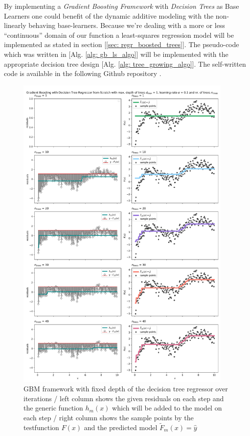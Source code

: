 \documentclass[12pt, a4paper]{article}
\begin{document}
By implementing a \textit{Gradient Boosting Framework} with \textit{Decision Trees} as Base Learners one could benefit of the dynamic additive modeling with the non-linearly behaving base-learners.
Because we're dealing with a more or less ``continuous'' domain of our function a least-squares regression model will be implemented as stated in section [\ref{sec: regr_boosted_trees}]. The pseudo-code which was written in [Alg. \ref{alg: gb_ls_algo}] will be implemented with the appropriate decision tree design [Alg. \ref{alg: tree_growing_algo}]. The self-written code is available in the following Github repository \cite{Gschaider}.
\begin{figure}[!htpb]
    \centering
    \includegraphics[width=0.95\textwidth,trim={0 0 0 0},clip]{figures/gbm_iterations.png}
    \caption[GBM framework iterations]{GBM framework with fixed depth of the decision tree regressor over iterations / left column shows the given residuals on each step and the generic function $h_m(x)$ which will be added to the model on each step / right column shows the sample points by the testfunction $F(x)$ and the predicted model $\tilde{F}_m(x) = \hat{y}$}
    \label{fig: gbm_iterations}
\end{figure}
\end{document}

